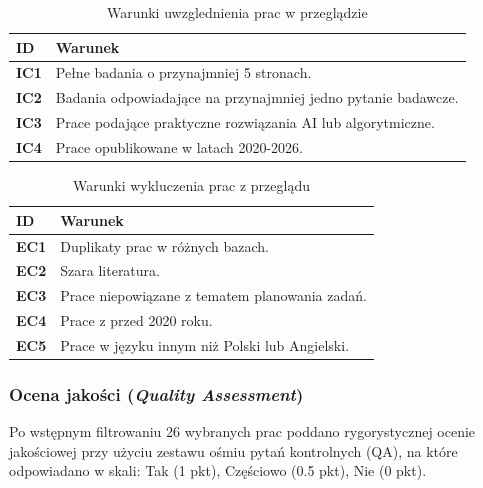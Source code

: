 \begin{table}[h!]
\caption{Warunki uwzglednienia prac w przeglądzie}\label{tab:inclusion_criteria}       
\begin{tabular}{p{0.8cm}p{14.4cm}}
\hline
\textbf{ID} & \textbf{Warunek} \\ \hline
\textbf{IC1} & Pełne badania o przynajmniej 5 stronach. \\ \hline
\textbf{IC2} & Badania odpowiadające na przynajmniej jedno pytanie badawcze. \\ \hline
\textbf{IC3} & Prace podające praktyczne rozwiązania AI lub algorytmiczne. \\ \hline
\textbf{IC4} & Prace opublikowane w latach 2020-2026. \\ \hline
\end{tabular}
\end{table}

\begin{table}[h!]
\caption{Warunki wykluczenia prac z przeglądu}\label{tab:exclusion_criteria}       
\begin{tabular}{p{0.8cm}p{14.4cm}}
\hline
\textbf{ID} & \textbf{Warunek} \\ \hline
\textbf{EC1} & Duplikaty prac w różnych bazach. \\ \hline
\textbf{EC2} & Szara literatura. \\ \hline
\textbf{EC3} & Prace niepowiązane z tematem planowania zadań. \\ \hline
\textbf{EC4} & Prace z przed 2020 roku. \\ \hline
\textbf{EC5} & Prace w języku innym niż Polski lub Angielski. \\ \hline
\end{tabular}
\end{table}

\subsubsection{Ocena jakości (\textit{Quality Assessment})}\label{sec:QA}

\quad Po wstępnym filtrowaniu 26 wybranych prac poddano rygorystycznej ocenie jakościowej przy użyciu zestawu ośmiu pytań kontrolnych (QA), na które odpowiadano w skali: Tak (1 pkt), Częściowo (0.5 pkt), Nie (0 pkt). 

